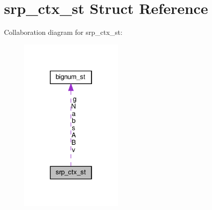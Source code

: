 \hypertarget{structsrp__ctx__st}{}\section{srp\+\_\+ctx\+\_\+st Struct Reference}
\label{structsrp__ctx__st}


Collaboration diagram for srp\+\_\+ctx\+\_\+st\+:
\nopagebreak
\begin{figure}[H]
\begin{center}
\leavevmode
\includegraphics[width=142pt]{structsrp__ctx__st__coll__graph}
\end{center}
\end{figure}
